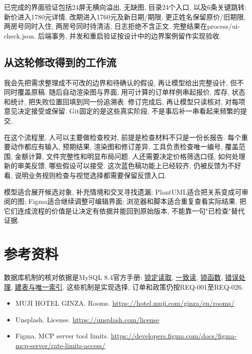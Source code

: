 \documentclass[cn,nofont,11pt,a4paper]{elegantpaper}
\providecommand{\tightlist}{\setlength{\itemsep}{0pt}\setlength{\parskip}{0pt}}
\begin{document}
已完成的界面验证包括24屏无横向溢出, 无缺图, 目录24个入口, 以及6条关键跳转: 新价进入1780元详情, 改期进入1760元及新日期/期限, 更正姓名保留原价/旧期限, 两房号同时入住, 两房号同时待清洁, 日志拒绝不含正文. 完整结果在process/ui-check.json. 后端事务, 并发和重启验证按设计中的边界案例留作实现验收.

\hypertarget{ux4eceux8fd9ux8f6eux4feeux6539ux5f97ux5230ux7684ux5de5ux4f5cux6d41}{%
\subsection{从这轮修改得到的工作流}\label{ux4eceux8fd9ux8f6eux4feeux6539ux5f97ux5230ux7684ux5de5ux4f5cux6d41}}

我会先把需求整理成不可改的边界和待确认的假设, 再让模型给出完整设计, 但不同时覆盖原稿. 随后自动渲染图与界面, 用可计算的订单样例串起报价, 库存, 状态和统计, 把失败位置回填到同一份追溯表. 修订完成后, 再让模型只读核对, 对每项意见决定接受或保留. Git固定的是这些真实阶段, 不是事后补一串看起来频繁的提交.

在这个流程里, 人可以主要做检查校对, 前提是检查材料不只是一份长报告. 每个重要动作都应有输入, 预期结果, 渲染图和修订差异, 工具负责检查唯一编号, 覆盖范围, 金额计算, 文件完整性和明显布局问题. 人还需要决定价格筛选口径, 如何处理新的审美反馈, 哪些假设可以接受. 这次蓝色稿功能上已经较齐, 仍被反馈为不好看, 说明业务规则检查与视觉选择都需要保留反馈入口.

模型适合展开候选对象, 补充情境和交叉寻找遗漏; PlantUML适合把关系变成可审阅的图; Figma适合继续调整可编辑界面; 浏览器和脚本适合重复查看实际结果. 把它们连成流程的价值是让决定有依据并能回到原始版本, 不能靠一句"已检查"替代证据.

\begingroup\small\setlength{\parskip}{.1em}\hypertarget{ux53c2ux8003ux8d44ux6599}{%
\section{参考资料}\label{ux53c2ux8003ux8d44ux6599}}

数据库机制的核对依据是MySQL 8.4官方手册: \href{https://dev.mysql.com/doc/refman/8.4/en/innodb-locking-reads.html}{锁定读取}, \href{https://dev.mysql.com/doc/refman/8.4/en/innodb-consistent-read.html}{一致读}, \href{https://dev.mysql.com/doc/refman/8.4/en/locking-functions.html}{锁函数}, \href{https://dev.mysql.com/doc/refman/8.4/en/innodb-error-handling.html}{错误处理}, \href{https://dev.mysql.com/doc/refman/8.4/en/create-table.html}{建表与唯一索引}. 这些机制是实现选择, 订单和政策仍按REQ-001至REQ-026.

\begin{itemize}
\tightlist
\item
  MUJI HOTEL GINZA. Rooms. \url{https://hotel.muji.com/ginza/en/rooms/}
\item
  Unsplash. License. \url{https://unsplash.com/license}
\item
  Figma. MCP server tool limits. \url{https://developers.figma.com/docs/figma-mcp-server/rate-limits-access/}
\end{itemize}
\endgroup
\end{document}
